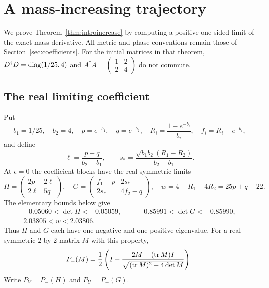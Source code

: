 \section{A mass-increasing trajectory}\label{sec:increase}

We prove Theorem~\ref{thm:introincrease} by computing a positive one-sided
limit of the exact mass derivative. All metric and phase conventions
remain those of Section~\ref{sec:coefficients}.
For the initial matrices in that theorem,
$D^\dagger D=\operatorname{diag}(1/25,4)$ and
$A^\dagger A=\left(\begin{smallmatrix}1&2\\2&4\end{smallmatrix}\right)$
do not commute.

\subsection{The real limiting coefficient}
Put
\[
 b_1=1/25,\quad b_2=4,\quad p=e^{-b_1},\quad q=e^{-b_2},
 \quad R_i=\frac{1-e^{-b_i}}{b_i},\quad f_i=R_i-e^{-b_i},
\]
and define
\[
 \ell=\frac{p-q}{b_2-b_1},\qquad
 s_*=\frac{\sqrt{b_1b_2}(R_1-R_2)}{b_2-b_1}.
\]
At $\epsilon=0$ the coefficient blocks have the real symmetric limits
\begin{equation}\label{eq:realblocks}
 H=\begin{pmatrix}2p&2\ell\\2\ell&5q\end{pmatrix},\quad
 G=\begin{pmatrix}f_1-p&2s_*\\2s_*&4f_2-q\end{pmatrix},\quad
 w=4-R_1-4R_2=25p+q-22.
\end{equation}
The elementary bounds below give
\begin{equation}\label{eq:realblocksigns}
 \begin{gathered}
 -0.05060<\det H<-0.05059,\qquad
 -0.85991<\det G<-0.85990,\\
 2.03805<w<2.03806 .
 \end{gathered}
\end{equation}
Thus $H$ and $G$ each have one negative and one positive eigenvalue.
For a real symmetric $2$ by $2$ matrix $M$ with this property,
\begin{equation}\label{eq:negativeprojection}
 P_-(M)=\frac12\left(I-
 \frac{2M-(\operatorname{tr} M)I}{\sqrt{(\operatorname{tr} M)^2-4\det M}}\right).
\end{equation}
Write $P_V=P_-(H)$ and $P_U=P_-(G)$.


